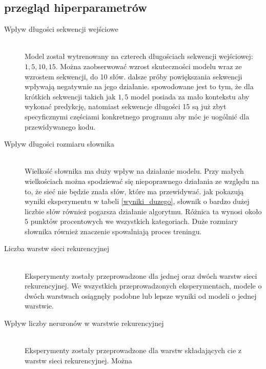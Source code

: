 \subsection{przegląd hiperparametrów}
\begin{description}
    \item[Wpływ długości sekwencji wejściowe] 
    \hfill \\ Model został wytrenowany na czterech długościach sekwencji wejściowej: \begin{math}1, 5, 10, 15\end{math}. Można
    zaobserwować wzrost skuteczności modelu wraz ze wzrostem sekwencji, do 10 słów. dalsze próby powiększania sekwencji wpływają negatywnie 
    na jego działanie. spowodowane jest to tym, że dla krótkich sekwencji takich jak \begin{math}1, 5\end{math} model posiada za mało 
    kontekstu aby wykonać predykcję, natomiast sekwencje długości 15 są już zbyt specyficznymi częściami konkretnego programu aby móc je 
    uogólnić dla przewidywanego kodu. \\
    \item[Wpływ długości rozmiaru słownika] 
    \hfill \\ Wielkość słownika ma duży wpływ na działanie modelu. Przy małych wielkościach można spodziewać się niepoprawnego działania 
    ze względu na to, że sieć nie będzie znała słów, które ma przewidywać. 
    jak pokazują wyniki eksperymentu w tabeli \ref{wyniki_duzego}, słownik o bardzo dużej liczbie słów również pogarsza działanie algorytmu. 
    Różnica ta wynosi około \begin{math}5 \end{math} punktów procentowych we wszystkich kategoriach. Duże rozmiary słownika również znaczenie spowalniają 
    proces treningu. \\
    \item[Liczba warstw sieci rekurencyjnej]
    \hfill \\ Eksperymenty zostały przeprowadzone dla jednej oraz dwóch warstw sieci rekurencyjnej. 
    We wszystkich przeprowadzonych eksperymentach, modele o dwóch warstwach osiągnęły podobne lub lepsze wyniki od modeli o jednej warstwie. \\
    \item[Wpływ liczby neruronów w warstwie rekurencyjnej]
    \hfill \\ Eksperymenty zostały przeprowadzone dla warstw składających cie z \begin{math} \end{math} warstw sieci rekurencyjnej. Można 

\end{description}
